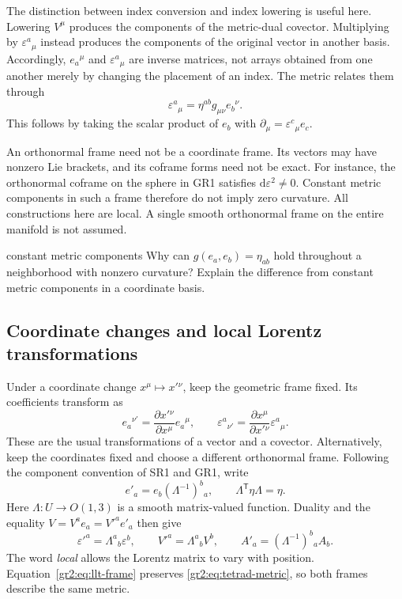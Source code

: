 \documentclass[11pt,a4paper]{article}
\numberwithin{equation}{section}
\newcommand{\dd}{\mathrm d}
\begin{document}
The distinction between index conversion and index lowering is useful
here. Lowering \(V^\mu\) produces the components of the metric-dual
covector. Multiplying by \(\varepsilon^a{}_\mu\) instead produces the
components of the original vector in another basis. Accordingly,
\(e_a{}^\mu\) and \(\varepsilon^a{}_\mu\) are inverse matrices, not
arrays obtained from one another merely by changing the placement of
an index. The metric relates them through
\[
 \varepsilon^a{}_\mu=\eta^{ab}g_{\mu\nu}e_b{}^\nu.
\]
This follows by taking the scalar product of \(e_b\) with
\(\partial_\mu=\varepsilon^c{}_\mu e_c\).

An orthonormal frame need not be a coordinate frame. Its vectors may
have nonzero Lie brackets, and its coframe forms need not be exact.
For instance, the orthonormal coframe on the sphere in GR1 satisfies
\(\dd\varepsilon^2\neq0\). Constant metric components in such a frame
therefore do not imply zero curvature. All constructions here are
local. A single smooth orthonormal frame on the entire manifold is
not assumed.

\begin{studentwork}[1.7cm]{constant metric components}
Why can \(g(e_a,e_b)=\eta_{ab}\) hold throughout a neighborhood
with nonzero curvature? Explain the difference from constant metric
components in a coordinate basis.
\end{studentwork}

\subsection{Coordinate changes and local Lorentz transformations}

Under a coordinate change \(x^\mu\mapsto x'{}^\nu\), keep the
geometric frame fixed. Its coefficients transform as
\[
 e_a{}^{\nu'}=\frac{\partial x'{}^\nu}{\partial x^\mu}e_a{}^\mu,
 \qquad
 \varepsilon^a{}_{\nu'}=
 \frac{\partial x^\mu}{\partial x'{}^\nu}\varepsilon^a{}_\mu.
\]
These are the usual transformations of a vector and a covector.
Alternatively, keep the coordinates fixed and choose a different
orthonormal frame. Following the component convention of SR1 and GR1,
write
\begin{equation}
 e'_a=e_b(\Lambda^{-1})^b{}_a,
 \qquad
 \Lambda^{\mathsf T}\eta\Lambda=\eta.
 \label{gr2:eq:llt-frame}
\end{equation}
Here \(\Lambda:U\to O(1,3)\) is a smooth matrix-valued function.
Duality and the equality \(V=V^a e_a=V'^a e'_a\) then give
\begin{equation}
 \varepsilon'^a=\Lambda^a{}_b\varepsilon^b,
 \qquad
 V'^a=\Lambda^a{}_b V^b,
 \qquad
 A'_a=(\Lambda^{-1})^b{}_a A_b.
 \label{gr2:eq:llt-components}
\end{equation}
The word \emph{local} allows the Lorentz matrix to vary with position.
Equation~\eqref{gr2:eq:llt-frame} preserves
\eqref{gr2:eq:tetrad-metric}, so both frames describe the same metric.
\end{document}
